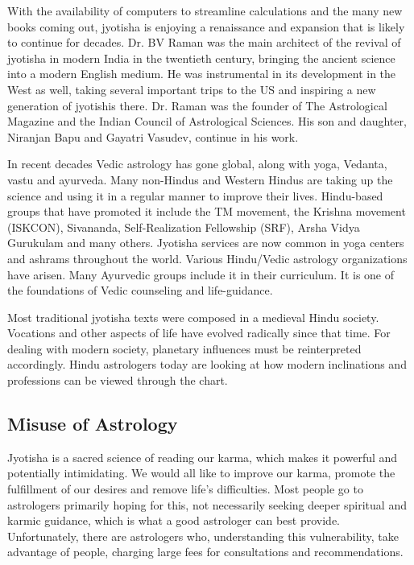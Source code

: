 With the availability of computers to streamline calculations and the many new books coming out, jyotisha is enjoying a renaissance and expansion that is likely to continue for decades. Dr. BV Raman was the main architect of the revival of jyotisha in modern India in the twentieth century, bringing the ancient science into a modern English medium. He was instrumental in its development in the West as well, taking several important trips to the US and inspiring a new generation of jyotishis there. Dr. Raman was the founder of The Astrological Magazine and the Indian Council of Astrological Sciences. His son and daughter, Niranjan Bapu and Gayatri Vasudev, continue in his work.

 

In recent decades Vedic astrology has gone global, along with yoga, Vedanta, vastu and ayurveda. Many non-Hindus and Western Hindus are taking up the science and using it in a regular manner to improve their lives. Hindu-based groups that have promoted it include the TM movement, the Krishna movement (ISKCON), Sivananda, Self-Realization Fellowship (SRF), Arsha Vidya Gurukulam and many others. Jyotisha services are now common in yoga centers and ashrams throughout the world. Various Hindu/Vedic astrology organizations have arisen. Many Ayurvedic groups include it in their curriculum. It is one of the foundations of Vedic counseling and life-guidance.

 

Most traditional jyotisha texts were composed in a medieval Hindu society. Vocations and other aspects of life have evolved radically since that time. For dealing with modern society, planetary influences must be reinterpreted accordingly. Hindu astrologers today are looking at how modern inclinations and professions can be viewed through the chart.

 

\subsection{Misuse of Astrology}

Jyotisha is a sacred science of reading our karma, which makes it powerful and potentially intimidating. We would all like to improve our karma, promote the fulfillment of our desires and remove life’s difficulties. Most people go to astrologers primarily hoping for this, not necessarily seeking deeper spiritual and karmic guidance, which is what a good astrologer can best provide. Unfortunately, there are astrologers who, understanding this vulnerability, take advantage of people, charging large fees for consultations and recommendations.

